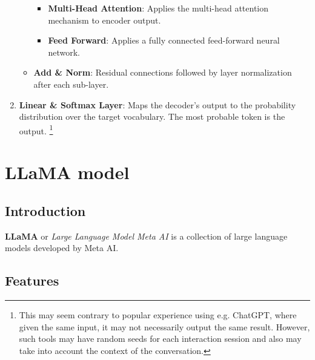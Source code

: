 \begin{enumerate}
\begin{itemize}
\begin{itemize}
			            \item \textbf{Multi-Head Attention}: Applies the multi-head attention mechanism to encoder output.
			            \item \textbf{Feed Forward}: Applies a fully connected feed-forward neural network.
		            \end{itemize}
		      \item \textbf{Add \& Norm}: Residual connections followed by layer normalization after each sub-layer.
	      \end{itemize}
	\item \textbf{Linear \& Softmax Layer}: Maps the decoder’s output to the probability distribution over the target vocabulary. The most probable token is the output. \footnote{This may seem contrary to popular experience using e.g. ChatGPT, where given the same input, it may not necessarily output the same result. However, such tools may have random seeds for each interaction session and also may take into account the context of the conversation. }
\end{enumerate}




\section{LLaMA model}

\subsection{Introduction}
\textbf{LLaMA} or \textit{Large Language Model Meta AI} \cite{llama} is a collection of large language models developed by Meta AI.

\subsection{Features}

